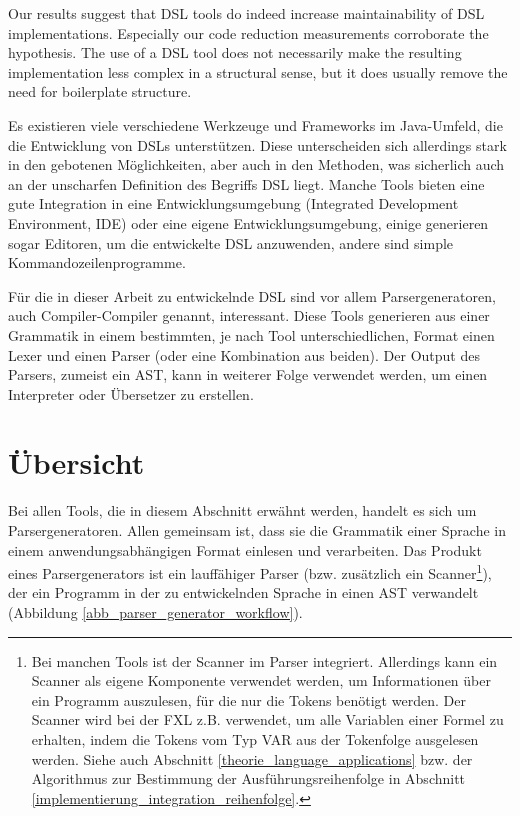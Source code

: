 \begin{myquote}
Our results suggest that DSL tools do indeed increase maintainability
of DSL implementations. Especially our code reduction measurements
corroborate the hypothesis. The use of a DSL tool does
not necessarily make the resulting implementation less complex in
a structural sense, but it does usually remove the need for boilerplate
structure. \cite{KlSt10}
\end{myquote}

Es existieren viele verschiedene Werkzeuge und Frameworks im  Java-Umfeld, die die Entwicklung von DSLs unterstützen. Diese unterscheiden sich al\-ler\-dings stark in den gebotenen Möglichkeiten, aber auch in den Methoden, was sicherlich auch an der unscharfen Definition des Begriffs DSL liegt. Manche Tools bieten eine gute Integration in eine Entwicklungsumgebung (Integrated Development Environment, IDE) oder eine eigene Entwicklungsumgebung, einige generieren sogar Editoren, um die entwickelte DSL anzuwenden, andere sind simple Kommandozeilenprogramme.

Für die in dieser Arbeit zu entwickelnde DSL sind vor allem Parsergeneratoren, auch Compiler-Compiler genannt, interessant. Diese Tools generieren aus einer Grammatik in einem bestimmten, je nach Tool unterschiedlichen, Format einen Lexer und einen Parser (oder eine Kombination aus beiden). Der Output des Parsers, zumeist ein AST, kann in weiterer Folge verwendet werden, um einen Interpreter oder Übersetzer zu erstellen.


\section{Über\-sicht}

Bei allen Tools, die in diesem Abschnitt erwähnt werden, handelt es sich um Parsergeneratoren. Allen gemeinsam ist, dass sie die Grammatik einer Sprache in einem anwendungsabhängigen Format einlesen und verarbeiten. Das Produkt eines Parsergenerators ist ein lauffähiger  Parser (bzw. zusätzlich ein Scanner\footnote{Bei manchen Tools ist der Scanner im Parser integriert. Allerdings kann ein Scanner als eigene Komponente verwendet werden, um Informationen über ein Programm auszulesen, für die nur die Tokens benötigt werden. Der Scanner wird bei der FXL z.B. verwendet, um alle Variablen einer Formel zu erhalten, indem die Tokens vom Typ VAR aus der Tokenfolge ausgelesen werden. Siehe auch Abschnitt \ref{theorie_language_applications} bzw. der Algorithmus zur Bestimmung der Aus\-führ\-ungsreihenfolge in Abschnitt \ref{implementierung_integration_reihenfolge}.}), der ein Programm in der zu entwickelnden Sprache in einen AST verwandelt (Abbildung \ref{abb_parser_generator_workflow}). 

